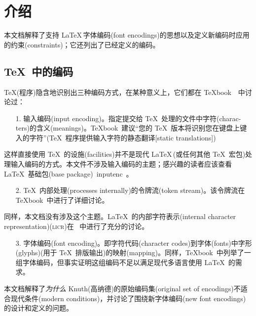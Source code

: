 \documentclass{ltxguide}[1994/11/20]
\title{\heiti {\Huge \textbf{\LaTeX{}}\ 的字体编码}}
\author{Frank Mittelbach (弗兰克·米特巴赫) \and Robin Fairbairns (罗宾·费尔贝恩斯) \and Werner Lemberg (沃纳·莱姆伯格)\\[5pt] \LaTeX\ 项目团队\\[5pt] \ \ 赣医一附院神经科\ \ 黄旭华\ \ \ \ 译}
\date{\copyright~Copyright 1995--2016 \\[5pt] 2016 年 2 月 18 日}
\providecommand{\Pkg}[1]{%
  \textsf{#1}}
\begin{document}
\maketitle

\tableofcontents

\section{介绍}

本文档解释了支持 \LaTeX{}\,字体编码(font encodings)的思想以及定义新编码时应用的约束(constraints)；它还列出了已经定义的编码。

\subsection{\TeX{}\ 中的编码}

\TeX{}(程序)隐含地识别出三种编码方式，在某种意义上，它们都在 \TeX{}book~\cite{A-W:DKn86}\ 中讨论过：
\begin{itemize}
\item[1.] 输入编码(input encoding)。指定提交给 \TeX{}\ 处理的文件中字符(charac-ters)的含义(meanings)。\TeX{}book\ 建议“您的 \TeX{}\ 版本将识别您在键盘上键入的字符”(\TeX{}\ 程序提供输入字符的静态翻译[static translations])
\end{itemize}
这样直接使用 \TeX{}\ 的设施(facilities)并不是现代 \LaTeX{}\,(或任何其他 \TeX{}\ 宏包)处理输入编码的方式。本文件不涉及输入编码的主题；感兴趣的读者应该查看 \LaTeX{}\ 基础包(base package)\,\Pkg{inputenc}\ \cite[第~7.5.2~节，第~357~页]{A-W:MG2004}。
\begin{itemize}
\item[2.] \TeX{}\ 内部处理(processes internally)的令牌流(token stream)。该令牌流在 \TeX{}book\ 中进行了详细讨论。
\end{itemize}
同样，本文档没有涉及这个主题。\LaTeX{}\ 的内部字符表示(internal character representation)(\textsc{licr})在 \cite[第~7.11.2~节，第~442~页]{A-W:MG2004}\ 中进行了充分的讨论。
\begin{itemize}
\item[3.] 字体编码(font encoding)。即字符代码(character codes)到字体(fonts)中字形(glyphs)(用于 \TeX{}\ 排版输出)的映射(mapping)。同样，\TeX{}book\ 中列举了一组字体编码，但事实证明这组编码不足以满足现代多语言使用 \LaTeX\ 的需求。
\end{itemize}
本文档解释了\emph{为什么} Knuth(高纳德)的原始编码集(original set of encodings)不适合现代条件(modern conditions)，并讨论了围绕新字体编码(new font encodings)的设计和定义的问题。
\end{document}
